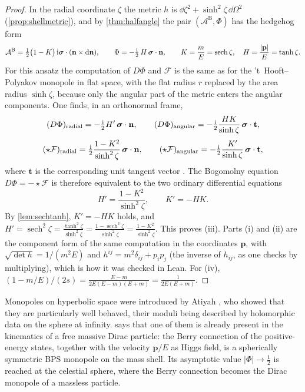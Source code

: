 \begin{proof}
In the radial coordinate $\zeta$ the metric $h$ is $\dd\zeta^2+\sinh^2\zeta\,\dd\Omega^2$ (\cref{prop:shellmetric}), and by \cref{thm:halfangle} the pair $(\mathcal A^{\mathrm B},\Phi)$ has the hedgehog form
\[
\mathcal A^{\mathrm B}=\tfrac12\bigl(1-K\bigr)\,\mathrm{i}\boldsymbol{\sigma}\cdot(\mathbf n\times\mathrm{d}\mathbf n),\qquad \Phi=-\tfrac{\mathrm{i}}2\,H\,\boldsymbol{\sigma}\cdot\mathbf n,\qquad K=\frac mE=\operatorname{sech}\zeta,\quad H=\frac{|\mathbf p|}E=\tanh\zeta .
\]
For this ansatz the computation of $D\Phi$ and $\mathcal F$ is the same as for the 't~Hooft--Polyakov monopole in flat space, with the flat radius $r$ replaced by the area radius $\sinh\zeta$, because only the angular part of the metric enters the angular components. One finds, in an orthonormal frame,
\[
(D\Phi)_{\rm radial}=-\tfrac{\mathrm{i}}2H'\,\boldsymbol{\sigma}\cdot\mathbf n,\qquad (D\Phi)_{\rm angular}=-\tfrac{\mathrm{i}}2\frac{HK}{\sinh\zeta}\,\boldsymbol{\sigma}\cdot\mathbf t,
\]
\[
(\star\mathcal F)_{\rm radial}=\tfrac{\mathrm{i}}2\frac{1-K^2}{\sinh^2\zeta}\,\boldsymbol{\sigma}\cdot\mathbf n,\qquad (\star\mathcal F)_{\rm angular}=-\tfrac{\mathrm{i}}2\frac{K'}{\sinh\zeta}\,\boldsymbol{\sigma}\cdot\mathbf t,
\]
where $\mathbf t$ is the corresponding unit tangent vector \cite{tHooft1974,Atiyah1984}. The Bogomolny equation $D\Phi=-\star\mathcal F$ is therefore equivalent to the two ordinary differential equations
\[
H'=\frac{1-K^2}{\sinh^2\zeta},\qquad K'=-HK .
\]
By \cref{lem:sechtanh}, $K'=-HK$ holds, and $H'=\operatorname{sech}^2\zeta=\frac{\tanh^2\zeta}{\sinh^2\zeta}=\frac{1-\operatorname{sech}^2\zeta}{\sinh^2\zeta}=\frac{1-K^2}{\sinh^2\zeta}$. This proves (iii). Parts (i) and (ii) are the component form of the same computation in the coordinates $\mathbf p$, with $\sqrt{\det h}=1/(m^2E)$ and $h^{ij}=m^2\delta_{ij}+p_ip_j$ (the inverse of $h_{ij}$, as one checks by multiplying), which is how it was checked in Lean. For (iv), $(1-m/E)/(2s)=\frac{E-m}{2E(E-m)(E+m)}=\frac1{2E(E+m)}$.
\end{proof}


Monopoles on hyperbolic space were introduced by Atiyah \cite{Atiyah1984}, who showed that they are particularly well behaved, their moduli being described by holomorphic data on the sphere at infinity.  says that one of them is already present in the kinematics of a free massive Dirac particle: the Berry connection of the positive-energy states, together with the velocity $\mathbf p/E$ as Higgs field, is a spherically symmetric BPS monopole on the mass shell. Its asymptotic value $|\Phi|\to\frac12$ is reached at the celestial sphere, where the Berry connection becomes the Dirac monopole of a massless particle.

